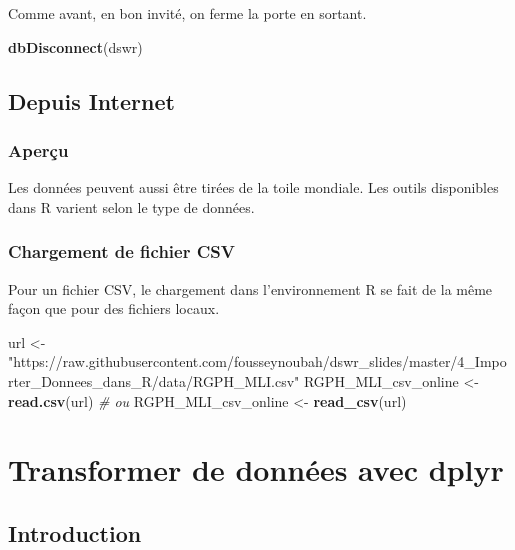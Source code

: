 \documentclass[]{book}
\newenvironment{Shaded}{\begin{snugshade}}{\end{snugshade}}
\newcommand{\KeywordTok}[1]{\textcolor[rgb]{0.13,0.29,0.53}{\textbf{#1}}}
\newcommand{\StringTok}[1]{\textcolor[rgb]{0.31,0.60,0.02}{#1}}
\newcommand{\CommentTok}[1]{\textcolor[rgb]{0.56,0.35,0.01}{\textit{#1}}}
\newcommand{\NormalTok}[1]{#1}
\begin{document}
Comme avant, en bon invité, on ferme la porte en sortant.

\begin{Shaded}
\begin{Highlighting}[]
\KeywordTok{dbDisconnect}\NormalTok{(dswr)}
\end{Highlighting}
\end{Shaded}

\section{Depuis Internet}\label{depuis-internet}

\subsection{Aperçu}\label{apercu-5}

Les données peuvent aussi être tirées de la toile mondiale. Les outils
disponibles dans R varient selon le type de données.

\subsection{Chargement de fichier CSV}\label{chargement-de-fichier-csv}

Pour un fichier CSV, le chargement dans l'environnement R se fait de la
même façon que pour des fichiers locaux.

\begin{Shaded}
\begin{Highlighting}[]
\NormalTok{url <-}\StringTok{ "https://raw.githubusercontent.com/fousseynoubah/dswr_slides/master/4_Importer_Donnees_dans_R/data/RGPH_MLI.csv"}
\NormalTok{RGPH_MLI_csv_online <-}\StringTok{ }\KeywordTok{read.csv}\NormalTok{(url)}
\CommentTok{# ou}
\NormalTok{RGPH_MLI_csv_online <-}\StringTok{ }\KeywordTok{read_csv}\NormalTok{(url)}
\end{Highlighting}
\end{Shaded}

\chapter{\texorpdfstring{Transformer de données avec
\textbf{dplyr}}{Transformer de données avec dplyr}}\label{transformer-de-donnees-avec-dplyr}

\section{Introduction}\label{introduction-4}
\end{document}
